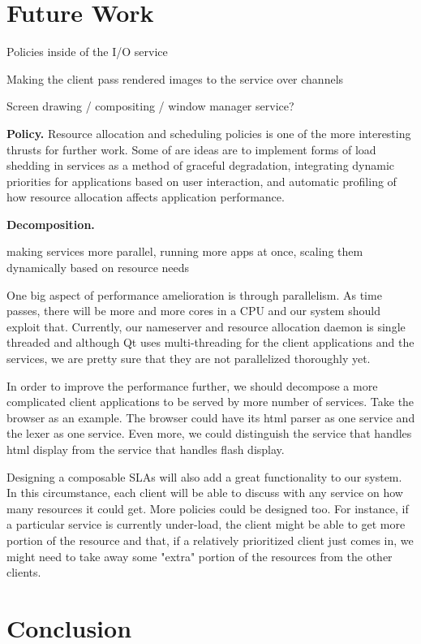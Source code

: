 \documentclass[letterpaper,twocolumn,11pt]{article}
\begin{document}
\section{Future Work}

Policies inside of the I/O service

Making the client pass rendered images to the service over channels

Screen drawing / compositing / window manager service?

\textbf{Policy.} Resource allocation and scheduling policies is one of the more interesting thrusts for further work. Some of are ideas are to implement forms of load shedding in services as a method of graceful degradation, integrating dynamic priorities for applications based on user interaction, and automatic profiling of how resource allocation affects application performance.

\textbf{Decomposition.} 

making services more parallel, running more apps at once, scaling them dynamically based on resource needs

One big aspect of performance amelioration is through parallelism. As time passes, there will be more and more cores in a CPU and our system should exploit that. Currently, our nameserver and resource allocation daemon is single threaded and although Qt uses multi-threading for the client applications and the services, we are pretty sure that they are not parallelized thoroughly yet. 

In order to improve the performance further, we should decompose a more complicated client applications to be served by more number of services. Take the browser as an example. The browser could have its html parser as one service and the lexer as one service. Even more, we could distinguish the service that handles html display from the service that handles flash display.

Designing a composable SLAs will also add a great functionality to our system. In this circumstance, each client will be able to discuss with any service on how many resources it could get. More policies could be designed too. For instance, if a particular service is currently under-load, the client might be able to get more portion of the resource and that, if a relatively prioritized client just comes in, we might need to take away some "extra" portion of the resources from the other clients.

\section{Conclusion}
\end{document}
